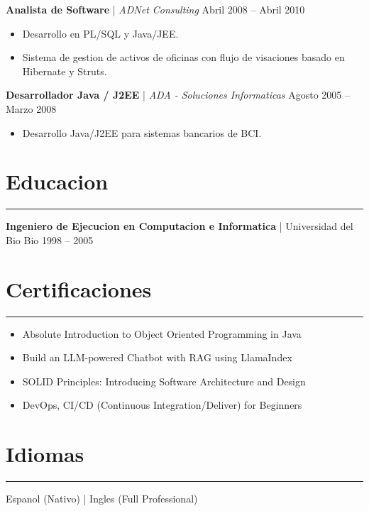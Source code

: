 \documentclass[11pt,a4paper]{article}
\begin{document}
\vspace{8pt}

\textbf{Analista de Software} | \textit{ADNet Consulting} \hfill Abril 2008 -- Abril 2010 \\
\begin{itemize}[noitemsep, topsep=0pt]
    \item Desarrollo en PL/SQL y Java/JEE.
    \item Sistema de gestion de activos de oficinas con flujo de visaciones basado en Hibernate y Struts.
\end{itemize}

\vspace{8pt}

\textbf{Desarrollador Java / J2EE} | \textit{ADA - Soluciones Informaticas} \hfill Agosto 2005 -- Marzo 2008 \\
\begin{itemize}[noitemsep, topsep=0pt]
    \item Desarrollo Java/J2EE para sistemas bancarios de BCI.
\end{itemize}

\section*{Educacion}
\hrule
\vspace{5pt}
\textbf{Ingeniero de Ejecucion en Computacion e Informatica} | Universidad del Bio Bio \hfill 1998 -- 2005

\section*{Certificaciones}
\hrule
\vspace{5pt}
\begin{itemize}[noitemsep, topsep=0pt]
    \item Absolute Introduction to Object Oriented Programming in Java
    \item Build an LLM-powered Chatbot with RAG using LlamaIndex
    \item SOLID Principles: Introducing Software Architecture and Design
    \item DevOps, CI/CD (Continuous Integration/Deliver) for Beginners
\end{itemize}

\section*{Idiomas}
\hrule
\vspace{5pt}
Espanol (Nativo) | Ingles (Full Professional)
\end{document}
